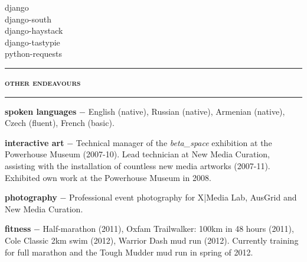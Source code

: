 \documentclass[a4paper,12pt]{letter}
\begin{document}
\begin{minipage}[t]{95mm}
\begin{minipage}[t]{44.5mm}
		{\normalsize
		django\\
		django-south\\
		django-haystack\\
		django-tastypie\\
		python-requests}
	\end{minipage}

	\vspace{4mm}
	\rule[1mm]{\linewidth}{1mm}
	{\Large\textsc{\textbf{other endeavours}}}\\
	\vspace{2mm}%
	\rule[1mm]{\linewidth}{1mm}
	
	{\small
	\textbf{\textsf{spoken languages}} $-$ English (native), Russian (native), Armenian (native), Czech (fluent), French (basic).
	
	\vspace{3mm}
	\textbf{\textsf{interactive art}} $-$ Technical manager of the \emph{beta\_space} exhibition at the Powerhouse Museum (2007-10). Lead technician at New Media Curation, assisting with the installation of countless new media artworks (2007-11). Exhibited own work at the Powerhouse Museum in 2008.
	
	\vspace{3mm}
	\textbf{\textsf{photography}} $-$ Professional event photography for X|Media Lab, AusGrid and New Media Curation.
	
	\vspace{3mm}
	\textbf{\textsf{fitness}} $-$ Half-marathon (2011), Oxfam Trailwalker: 100km in 48 hours (2011), Cole Classic 2km swim (2012), Warrior Dash mud run (2012). Currently training for full marathon and the Tough Mudder mud run in spring of 2012.}
\end{minipage}
\end{document}
